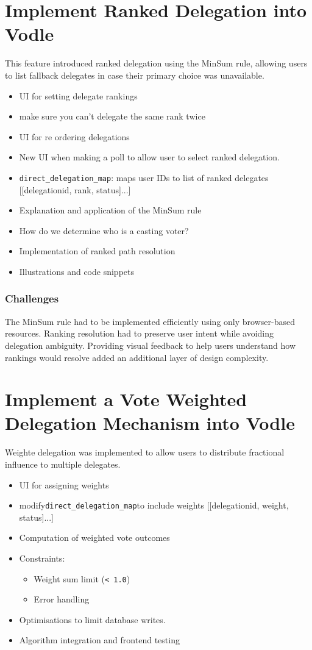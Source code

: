 \section{Implement Ranked Delegation into Vodle}\label{sec:design_ranked_delegation}
This feature introduced ranked delegation using the MinSum rule, allowing users to list fallback delegates in case their primary choice was unavailable.

\begin{itemize}
  \item UI for setting delegate rankings
  \item make sure you can't delegate the same rank twice
  \item UI for re ordering delegations
  \item New UI when making a poll to allow user to select ranked delegation.
  \item \verb|direct_delegation_map|: maps user IDs to list of ranked delegates [[delegationid, rank, status]...]
  \item Explanation and application of the MinSum rule
  \item How do we determine who is a casting voter?
  \item Implementation of ranked path resolution
  \item Illustrations and code snippets
\end{itemize}

\subsubsection{Challenges}
The MinSum rule had to be implemented efficiently using only browser-based resources. Ranking resolution had to preserve user intent while avoiding delegation ambiguity. Providing visual feedback to help users understand how rankings would resolve added an additional layer of design complexity.

\section{Implement a Vote Weighted Delegation Mechanism into Vodle}
Weighte delegation was implemented to allow users to distribute fractional influence to multiple delegates.

\begin{itemize}
  \item UI for assigning weights
  \item modify\verb|direct_delegation_map|to include weights [[delegationid, weight, status]...]
  \item Computation of weighted vote outcomes
  \item Constraints:
  \begin{itemize}
    \item Weight sum limit (\texttt{< 1.0})
    \item Error handling
  \end{itemize}
  \item Optimisations to limit database writes.
  \item Algorithm integration and frontend testing
\end{itemize}

